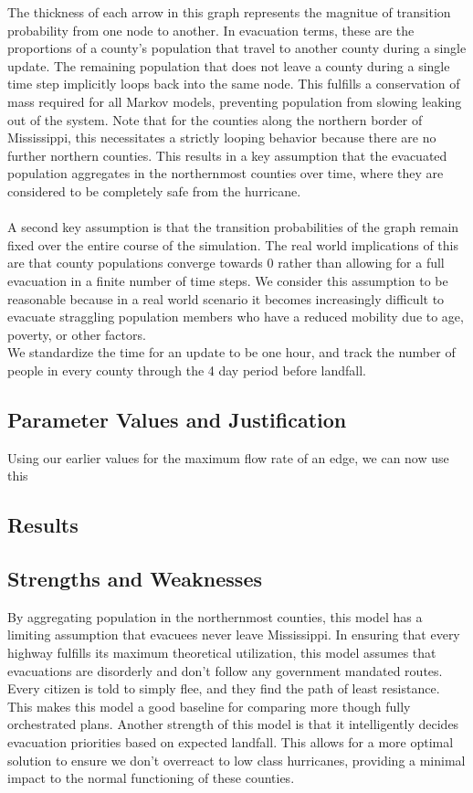 \documentclass[titlepage]{article}
\begin{document}
    The thickness of each arrow in this graph represents the magnitue of transition probability from one node to another. In evacuation terms, these are the proportions of a county's population that travel to another county during a single update. The remaining population that does not leave a county during a single time step implicitly loops back into the same node. This fulfills a conservation of mass required for all Markov models, preventing population from slowing leaking out of the system. Note that for the counties along the northern border of Mississippi, this necessitates a strictly looping behavior because there are no further northern counties. This results in a key assumption that the evacuated population aggregates in the northernmost counties over time, where they are considered to be completely safe from the hurricane. \\
    \\
    A second key assumption is that the transition probabilities of the graph remain fixed over the entire course of the simulation. The real world implications of this are that county populations converge towards 0 rather than allowing for a full evacuation in a finite number of time steps. We consider this assumption to be reasonable because in a real world scenario it becomes increasingly difficult to evacuate straggling population members who have a reduced mobility due to age, poverty, or other factors. \\



    We standardize the time for an update to be one hour, and track the number of people in every county through the 4 day period before landfall.

  \subsection{Parameter Values and Justification}
    Using our earlier values for the maximum flow rate of an edge, we can now use this
  \subsection{Results}
  \subsection{Strengths and Weaknesses}
    By aggregating population in the northernmost counties, this model has a limiting assumption that evacuees never leave Mississippi.
    In ensuring that every highway fulfills its maximum theoretical utilization, this model assumes that evacuations are disorderly and don't follow any government mandated routes. Every citizen is told to simply flee, and they find the path of least resistance. This makes this model a good baseline for comparing more though fully orchestrated plans. 
    Another strength of this model is that it intelligently decides evacuation priorities based on expected landfall. This allows for a more optimal solution to ensure we don't overreact to low class hurricanes, providing a minimal impact to the normal functioning of these counties.
\end{document}

